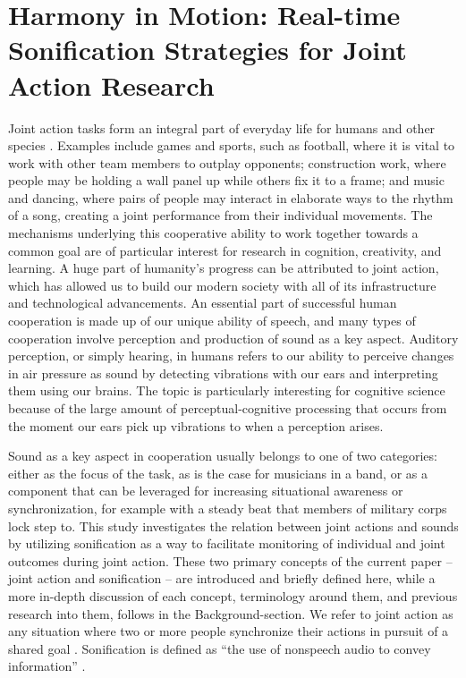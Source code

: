 \documentclass[10pt,a4paper,onecolumn]{article}
\begin{document}
\restoregeometry
\twocolumn
{
\hypersetup{linkcolor=Black}
\setcounter{tocdepth}{3}
\tableofcontents
}
\clearpage
\hypertarget{harmony-in-motion-real-time-sonification-strategies-for-joint-action-research}{%
\section{Harmony in Motion: Real-time Sonification Strategies for Joint Action Research}\label{harmony-in-motion-real-time-sonification-strategies-for-joint-action-research}}

Joint action tasks form an integral part of everyday life for humans \autocite{vanderwelUnderstandingJointAction2021} and other species \autocite{ferrari-tonioloTwoBrainsAction2019}. Examples include games and sports, such as football, where it is vital to work with other team members to outplay opponents; construction work, where people may be holding a wall panel up while others fix it to a frame; and music and dancing, where pairs of people may interact in elaborate ways to the rhythm of a song, creating a joint performance from their individual movements. The mechanisms underlying this cooperative ability to work together towards a common goal are of particular interest for research in cognition, creativity, and learning. A huge part of humanity's progress can be attributed to joint action, which has allowed us to build our modern society with all of its infrastructure and technological advancements. An essential part of successful human cooperation is made up of our unique ability of speech, and many types of cooperation involve perception and production of sound as a key aspect. Auditory perception, or simply hearing, in humans refers to our ability to perceive changes in air pressure as sound by detecting vibrations with our ears and interpreting them using our brains. The topic is particularly interesting for cognitive science because of the large amount of perceptual-cognitive processing that occurs from the moment our ears pick up vibrations to when a perception arises.

Sound as a key aspect in cooperation usually belongs to one of two categories: either as the focus of the task, as is the case for musicians in a band, or as a component that can be leveraged for increasing situational awareness or synchronization, for example with a steady beat that members of military corps lock step to. This study investigates the relation between joint actions and sounds by utilizing sonification as a way to facilitate monitoring of individual and joint outcomes during joint action. These two primary concepts of the current paper -- joint action and sonification -- are introduced and briefly defined here, while a more in-depth discussion of each concept, terminology around them, and previous research into them, follows in the Background-section. We refer to joint action as any situation where two or more people synchronize their actions in pursuit of a shared goal \autocite{knoblichPsychologicalResearchJoint2011}. Sonification is defined as ``the use of nonspeech audio to convey information'' \autocite[p.~4]{kramerSonificationReportStatus1999}.
\end{document}
